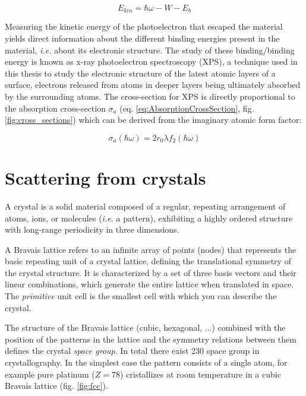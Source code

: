 \begin{equation}
    E_{kin} = \hbar\omega - W - E_b
\end{equation}

Measuring the kinetic energy of the photoelectron that escaped the material yields direct information about the different binding energies present in the material, \textit{i.e.} about its electronic structure.
The study of these binding/binding energy is known as x-ray photoelectron spectroscopy (XPS), a technique used in this thesis to study the electronic structure of the latest atomic layers of a surface, electrons released from atoms in deeper layers being ultimately absorbed by the surrounding atoms.
The cross-section for XPS is directly proportional to the absorption cross-section $\sigma_a$ (eq. \ref{eq:AbsorptionCrossSection}, fig. \ref{fig:cross_sections}) which can be derived from the imaginary atomic form factor:

\begin{equation}
    \label{eq:AbsorptionCrossSection}
    \sigma_a(\hbar\omega) = 2 r_0 \lambda f_2(\hbar\omega)
\end{equation}

\section{Scattering from crystals}\label{sec:ScatCrystal}

A crystal is a solid material composed of a regular, repeating arrangement of atoms, ions, or molecules (\textit{i.e.} a pattern), exhibiting a highly ordered structure with long-range periodicity in three dimensions.

A Bravais lattice refers to an infinite array of points (nodes) that represents the basic repeating unit of a crystal lattice, defining the translational symmetry of the crystal structure.
It is characterized by a set of three basis vectors and their linear combinations, which generate the entire lattice when translated in space.
The \textit{primitive} unit cell is the smallest cell with which you can describe the crystal.

The structure of the Bravais lattice (cubic, hexagonal, ...) combined with the position of the patterns in the lattice and the symmetry relations between them defines the crystal \textit{space group}.
In total there exist 230 space group in crystallography.
In the simplest case the pattern consists of a single atom, for example pure platinum ($Z=78$) cristallizes at room temperature in a cubic Bravais lattice (fig. \ref{fig:fcc}).

